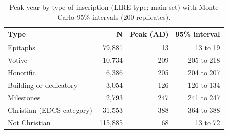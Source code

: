 \documentclass[11pt,a4paper]{article}
\begin{document}
\begin{table}[tbp]\centering\small\caption{Peak year by type of inscription (LIRE type; main set) with Monte Carlo 95\% intervals (200 replicates).}\label{tab:types}\begin{tabular}{lrrr}\toprule Type & N & Peak (AD) & 95\% interval\\\midrule
Epitaphs & 79,881 & 13 & 13 to 19\\
Votive & 10,734 & 209 & 205 to 218\\
Honorific & 6,386 & 205 & 204 to 207\\
Building or dedicatory & 3,054 & 126 & 126 to 134\\
Milestones & 2,793 & 247 & 241 to 247\\
Christian (EDCS category) & 31,553 & 388 & 364 to 388\\
Not Christian & 115,885 & 68 & 13 to 72\\
\bottomrule\end{tabular}\end{table}
\end{document}
